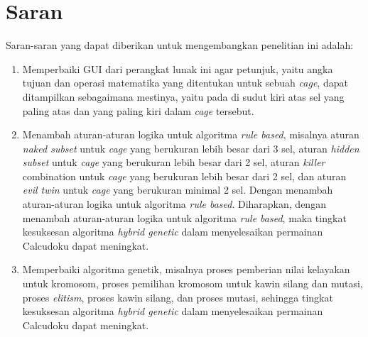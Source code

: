 \clearpage

\section{Saran}
\label{sec:saran}

Saran-saran yang dapat diberikan untuk mengembangkan penelitian ini adalah:

\begin{enumerate}
\item Memperbaiki GUI dari perangkat lunak ini agar petunjuk, yaitu angka tujuan dan operasi matematika yang ditentukan untuk sebuah \textit{cage}, dapat ditampilkan sebagaimana mestinya, yaitu pada di sudut kiri atas sel yang paling atas dan yang paling kiri dalam \textit{cage} tersebut.
\item Menambah aturan-aturan logika untuk algoritma \textit{rule based}, misalnya aturan \textit{naked subset} untuk \textit{cage} yang berukuran lebih besar dari 3 sel, aturan \textit{hidden subset} untuk \textit{cage} yang berukuran lebih besar dari 2 sel, aturan \textit{killer} combination untuk \textit{cage} yang berukuran lebih besar dari 2 sel, dan aturan \textit{evil twin} untuk \textit{cage} yang berukuran minimal 2 sel. Dengan menambah aturan-aturan logika untuk algoritma \textit{rule based}. Diharapkan, dengan menambah aturan-aturan logika untuk algoritma \textit{rule based}, maka tingkat kesuksesan algoritma \textit{hybrid genetic} dalam menyelesaikan permainan Calcudoku dapat meningkat.
\item Memperbaiki algoritma genetik, misalnya proses pemberian nilai kelayakan untuk kromosom, proses pemilihan kromosom untuk kawin silang dan mutasi, proses \textit{elitism}, proses kawin silang, dan proses mutasi, sehingga tingkat kesuksesan algoritma \textit{hybrid genetic} dalam menyelesaikan permainan Calcudoku dapat meningkat.
\end{enumerate}